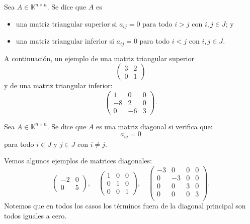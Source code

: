 \documentclass[compacto,10pt]{pubciencias-notas}
\begin{document}
\begin{defi}
    Sea $A\in \mathbb{K}^{n \times n}$. Se dice que $A$ es
    \begin{itemize}
    \item 
        una matriz triangular superior si $a_{ij} = 0 $ para todo $i>j$ con $i,j \in J$; y
    \item 
        una matriz triangular inferior si $a_{ij} = 0 $ para todo $i<j$ con $i,j \in J$.
    \end{itemize}
\end{defi}

\begin{ejem}
A continuación, un ejemplo de una matriz triangular superior
\[
	\begin{pmatrix}3&2\\0&1\end{pmatrix}
\]
y de una matriz triangular inferior:
\[
	\begin{pmatrix}1&0&0\\-8&2&0\\0&-6&3\end{pmatrix}.
\]
\end{ejem}

\begin{defi}
    Sea $A\in \mathbb{K}^{n \times n}$. Se dice que $A$ es una matriz diagonal si verifica que:
    \[ 
        a_{ij} = 0
    \]
    para todo $i\in J$ y $j\in J$ con $i\neq j$.
\end{defi}

\begin{ejem}
Vemos algunos ejemplos de matrices diagonales:
\[
	\begin{pmatrix}
	-2&0\\
	0&5
	\end{pmatrix},
	\quad
 	\begin{pmatrix}
	1&0&0\\
	0&1&0\\
	0&0&1
	\end{pmatrix},
	\quad
	\begin{pmatrix}
	-3&0&0&0\\
	0&-3&0&0\\
	0&0&3&0\\
	0&0&0&3\\
	\end{pmatrix}.
\]
Notemos que en todos los casos los términos fuera de la diagonal principal son todos iguales a cero. 
\end{ejem}
\end{document}
